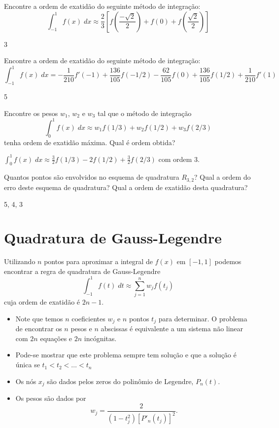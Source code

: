 \begin{exer}
Encontre a ordem de exatidão do seguinte método de integração:
$$\int_{-1}^1f(x)\;dx\approx \frac{2}{3}\left[f\left(\frac{-\sqrt{2}}{2}\right)+f(0)+f\left(\frac{\sqrt{2}}{2}\right)\right]$$
\end{exer}
\begin{resp}
3
\end{resp}


\begin{exer}
Encontre a ordem de exatidão do seguinte método de integração:
$$\int_{-1}^1f(x)\;dx=-\frac{1}{210}f'(-1)+\frac{136}{105} f(-1/2) - \frac{62}{105} f(0) + \frac{136}{105}f(1/2) +\frac{1}{210}f'(1)$$
\end{exer}
\begin{resp}
5
\end{resp}

\begin{exer} Encontre os pesos $w_1$, $w_2$ e $w_3$ tal que o método de integração
$$\int_0^1 f(x)\;dx \approx w_1 f(1/3)  + w_2f(1/2) + w_3f(2/3)$$
tenha ordem de exatidão máxima. Qual é ordem obtida?
\end{exer}
\begin{resp}
$\int_0^1 f(x)\;dx \approx \frac{3}{2} f(1/3)  -2f(1/2) + \frac{3}{2}f(2/3)$ com ordem 3.
\end{resp}

\begin{exer}
Quantos pontos são envolvidos no esquema de quadratura $R_{3,2}$? Qual a ordem do erro deste esquema de quadratura? Qual a ordem de exatidão desta quadratura?
\end{exer}
\begin{resp}
 5, 4, 3
\end{resp}


\section{Quadratura de Gauss-Legendre}

Utilizando $n$ pontos para aproximar a integral de $f(x)$ em $[-1,1]$ podemos encontrar a regra de quadratura de Gauss-Legendre
$$\int_{-1}^1 f(t)\;dt \approx \sum_{j=1}^n w_j f(t_j)$$
cuja ordem de exatidão é $2n-1$.

\begin{itemize}
\item Note que temos $n$ coeficientes $w_j$ e $n$ pontos $t_j$ para determinar. O problema de encontrar os $n$ pesos e $n$ abscissas é equivalente a um sistema não linear com $2n$ equações e $2n$ incógnitas.
\item Pode-se mostrar que este problema sempre tem solução e que a solução é única se $t_1<t_2<\ldots <t_n$
\item Os nós $x_j$ são dados pelos zeros do polinômio de Legendre, $P_n(t)$.
\item Os pesos são dados por
$$w_j = \frac{2}{\left( 1-t_j^2 \right) [P'_n(t_j)]^2}.$$
\end{itemize}

